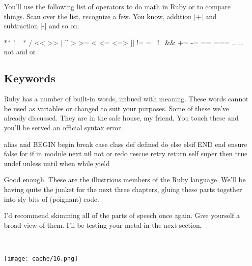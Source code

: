 \documentclass[12pt,twoside]{report}
\begin{document}
You'll use the following list of operators to do math in Ruby or to
compare things. Scan over the list, recognize a few.  You know,
addition \rubyinline|+| and subtraction
\rubyinline|-| and so on.


\begin{consolecode}

  ** !  ~  *  /  %
  << >> |  ^  >  >= <  <= <=>
  || != =~ !~ && += -= == ===
  .. ... not and or

\end{consolecode}




\subsection{Keywords}



Ruby has a number of built-in words, imbued with meaning.  These words
cannot be used as variables or changed to suit your purposes.  Some of
these we've already discussed.  They are in the safe house, my friend.
You touch these and you'll be served an official syntax error.


\begin{consolecode}

  alias   and     BEGIN   begin   break   case    class   def     defined 
  do      else    elsif   END     end     ensure  false   for     if 
  in      module  next    nil     not     or      redo    rescue  retry
  return  self    super   then    true    undef   unless  until   when 
  while   yield

\end{consolecode}


Good enough.  These are the illustrious members of the Ruby language.
We'll be having quite the junket for the next three chapters, gluing
these parts together into sly bits of (poignant) code.

I'd recommend skimming all of the parts of speech once again.  Give
yourself a broad view of them.  I'll be testing your metal in the next
section.

\ %

\texttt{[image: cache/16.png]}

\ %

\bigskip \bigskip \bigskip

\pagebreak
\end{document}
